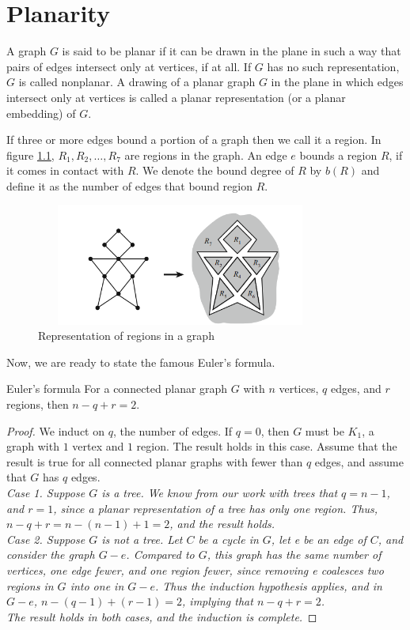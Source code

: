 \documentclass[../basic_graph_theory.tex]{subfiles}
\begin{document}
\chapter{Planarity}
\setcounter{chapter}{6} %
\setcounter{section}{0}
\setcounter{equation}{0}
\setcounter{figure}{0}

A graph $G$ is said to be planar if it can be drawn in the plane in such a way that pairs of edges intersect only at vertices, if at all. If $G$ has no such representation, $G$ is called nonplanar. A drawing of a planar graph $G$ in the plane in which edges intersect only at vertices is called a planar representation (or a planar embedding) of $G$.

If three or more edges bound a portion of a graph then we call it a region. In figure \ref{ref:regions}, $R_1, R_2, \dots, R_7$ are regions in the graph. An edge $e$ bounds a region $R$, if it comes in contact with $R$. We denote the bound degree of $R$ by $b(R)$ and define it as the number of edges that bound region $R$.

\begin{figure}[hbt!]
    \centering
    \includegraphics[height=4cm,width=9.5cm]{images/region.png}
    \caption{Representation of regions in a graph}
    \label{ref:regions}
\end{figure}

Now, we are ready to state the famous Euler's formula.
\begin{Thm}{Euler's formula}{}
    For a connected planar graph $G$ with $n$ vertices, $q$ edges, and $r$ regions, then $n-q+r=2$.
\end{Thm}
\begin{proof}
    We induct on $q$, the number of edges. If $q = 0$, then $G$ must be $K_1$, a graph with $1$ vertex and $1$ region. The result holds in this case. Assume that the result is true for all connected planar graphs with fewer than $q$ edges, and assume that $G$ has $q$ edges.\\
    \em{Case 1.} Suppose $G$ is a tree. We know from our work with trees that $q = n-1$, and $r = 1$, since a planar representation of a tree has only one region. Thus, $n - q + r = n - (n - 1) + 1 = 2$, and the result holds.\\
    \em{Case 2.} Suppose $G$ is not a tree. Let $C$ be a cycle in $G$, let e be an edge of $C$, and consider the graph $G - e$. Compared to $G$, this graph has the same number of vertices, one edge fewer, and one region fewer, since removing e coalesces two regions in $G$ into one in $G - e$. Thus the induction hypothesis applies, and in $G - e$, $n - (q - 1) + (r - 1) = 2$, implying that $n - q + r = 2$.\\
    The result holds in both cases, and the induction is complete.
\end{proof}
\end{document}
